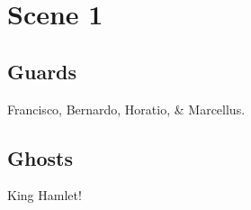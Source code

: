 \documentclass{article}
\begin{document}
\section{Scene 1}

\subsection{Guards}

Francisco, Bernardo, Horatio, \& Marcellus.

\subsection{Ghosts}

King Hamlet!
\end{document}
